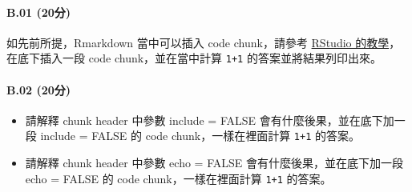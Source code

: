 \documentclass[
]{article}
\begin{document}
\hypertarget{b.01-20ux5206}{%
\paragraph{B.01 (20分)}\label{b.01-20ux5206}}

如先前所提，Rmarkdown 當中可以插入 code chunk，請參考
\href{https://rmarkdown.rstudio.com/lesson-3.html}{RStudio
的教學}，在底下插入一段 code chunk，並在當中計算 \texttt{1+1}
的答案並將結果列印出來。

\hypertarget{b.02-20ux5206}{%
\paragraph{B.02 (20分)}\label{b.02-20ux5206}}

\begin{itemize}
\item
  請解釋 chunk header 中參數 include = FALSE
  會有什麼後果，並在底下加一段 include = FALSE 的 code
  chunk，一樣在裡面計算 \texttt{1+1} 的答案。
\item
  請解釋 chunk header 中參數 echo = FALSE 會有什麼後果，並在底下加一段
  echo = FALSE 的 code chunk，一樣在裡面計算 \texttt{1+1} 的答案。
\end{itemize}
\end{document}
